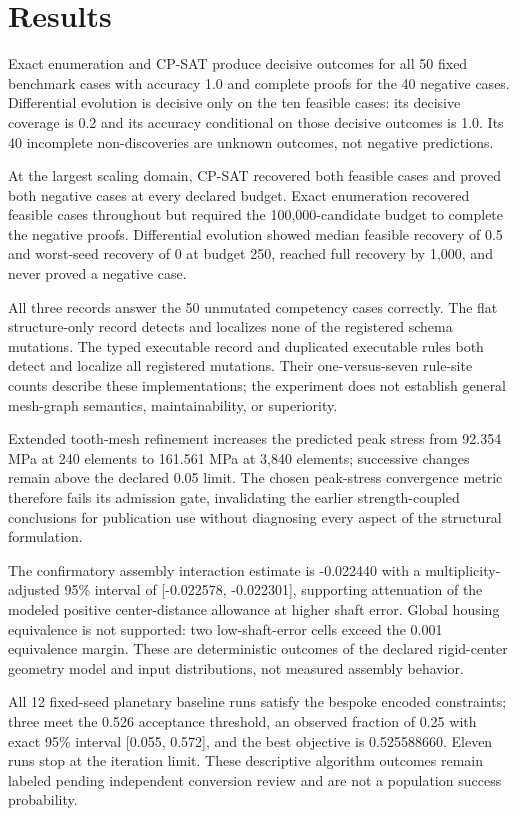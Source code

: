 \documentclass[preprint,12pt]{elsarticle}
\begin{document}
\section{Results}
Exact enumeration and CP-SAT produce decisive outcomes for all 50 fixed benchmark cases with accuracy 1.0 and complete proofs for the 40 negative cases. Differential evolution is decisive only on the ten feasible cases: its decisive coverage is 0.2 and its accuracy conditional on those decisive outcomes is 1.0. Its 40 incomplete non-discoveries are unknown outcomes, not negative predictions.

At the largest scaling domain, CP-SAT recovered both feasible cases and proved both negative cases at every declared budget. Exact enumeration recovered feasible cases throughout but required the 100,000-candidate budget to complete the negative proofs. Differential evolution showed median feasible recovery of 0.5 and worst-seed recovery of 0 at budget 250, reached full recovery by 1,000, and never proved a negative case.

All three records answer the 50 unmutated competency cases correctly. The flat structure-only record detects and localizes none of the registered schema mutations. The typed executable record and duplicated executable rules both detect and localize all registered mutations. Their one-versus-seven rule-site counts describe these implementations; the experiment does not establish general mesh-graph semantics, maintainability, or superiority.

Extended tooth-mesh refinement increases the predicted peak stress from 92.354 MPa at 240 elements to 161.561 MPa at 3,840 elements; successive changes remain above the declared 0.05 limit. The chosen peak-stress convergence metric therefore fails its admission gate, invalidating the earlier strength-coupled conclusions for publication use without diagnosing every aspect of the structural formulation.

The confirmatory assembly interaction estimate is -0.022440 with a multiplicity-adjusted 95\% interval of [-0.022578, -0.022301], supporting attenuation of the modeled positive center-distance allowance at higher shaft error. Global housing equivalence is not supported: two low-shaft-error cells exceed the 0.001 equivalence margin. These are deterministic outcomes of the declared rigid-center geometry model and input distributions, not measured assembly behavior.

All 12 fixed-seed planetary baseline runs satisfy the bespoke encoded constraints; three meet the 0.526 acceptance threshold, an observed fraction of 0.25 with exact 95\% interval [0.055, 0.572], and the best objective is 0.525588660. Eleven runs stop at the iteration limit. These descriptive algorithm outcomes remain labeled pending independent conversion review and are not a population success probability.
\end{document}
